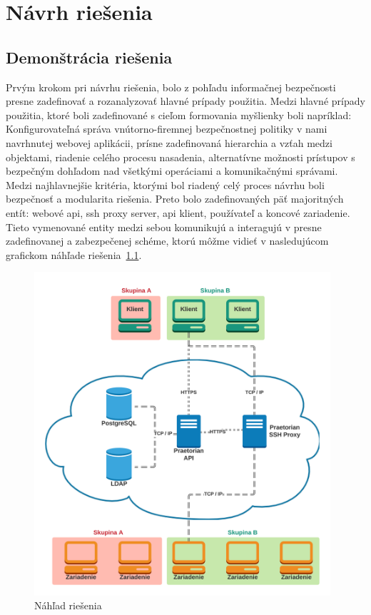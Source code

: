 \chapter{Návrh riešenia}\label{ch:návrh}

\section{Demonštrácia riešenia}\label{sec:demonstracia-riesenia}

Prvým krokom pri návrhu riešenia, bolo z pohľadu informačnej bezpečnosti presne zadefinovať a rozanalyzovať hlavné prípady
použitia.
Medzi hlavné prípady použitia, ktoré boli zadefinované s cieľom formovania myšlienky boli napríklad: Konfigurovateľná správa
vnútorno-firemnej bezpečnostnej politiky v nami navrhnutej webovej aplikácii, prísne zadefinovaná hierarchia a vzťah medzi objektami,
riadenie celého procesu nasadenia, alternatívne možnosti prístupov s bezpečným dohľadom nad všetkými operáciami a komunikačnými správami.
Medzi najhlavnejšie kritéria, ktorými bol riadený celý proces návrhu boli bezpečnosť a modularita riešenia.
Preto bolo zadefinovaných päť majoritných entít: webové api, ssh proxy server, api klient, používateľ a koncové zariadenie.
Tieto vymenované entity medzi sebou komunikujú a interagujú v presne zadefinovanej a zabezpečenej schéme, ktorú môžme vidieť
v nasledujúcom grafickom náhľade riešenia~\ref{fig:obr_8}.

\begin{figure}[H]
\begin{center}\includegraphics[width=\textwidth,height=12cm,keepaspectratio=true]{assets/demonstracia_riesenia.png}\end{center}
\caption[Náhľad riešenia]{Náhľad riešenia}\label{fig:obr_8}
\end{figure}

